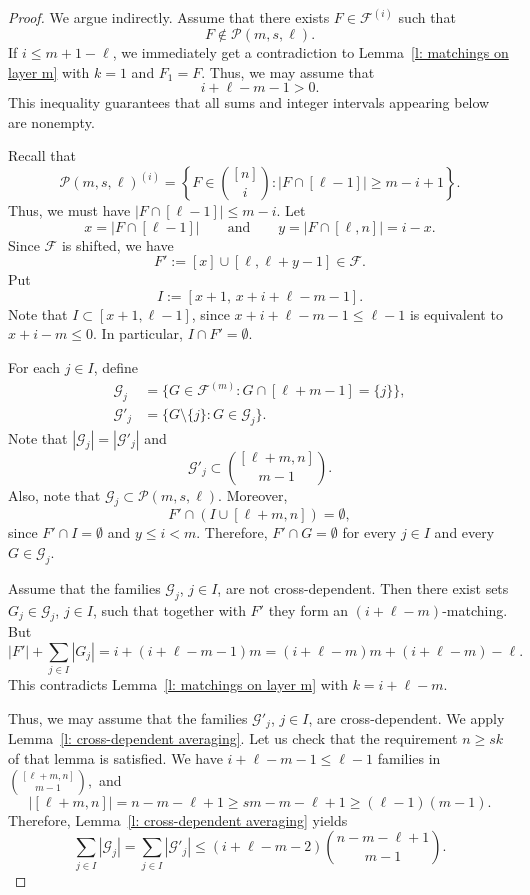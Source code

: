 \documentclass{article}
\begin{document}
\begin{proof}
    We argue indirectly. Assume that there exists $F \in \mathcal{F}^{(i)}$ such that
    \[
    F \notin \mathcal{P}(m, s, \ell).
    \]
    If $i \leq m + 1 - \ell$, we immediately get a contradiction to Lemma~\ref{l: matchings on layer m} with $k = 1$ and $F_1 = F$. Thus, we may assume that
    \[
    i + \ell - m - 1 > 0.
    \]
    This inequality guarantees that all sums and integer intervals appearing below are nonempty.

    Recall that
    \[
    \mathcal{P}(m, s, \ell)^{(i)} = \left\{F \in {[n]\choose i}: |F \cap [\ell - 1]| \geq m - i + 1\right\}.
    \]
    Thus, we must have $|F \cap [\ell - 1]| \leq m - i$. Let
    \[
    x = |F \cap [\ell - 1]|
    \qquad\text{and}\qquad
    y = |F \cap [\ell, n]| = i - x.
    \]
    Since $\mathcal{F}$ is shifted, we have
    \[
    F' := [x] \cup [\ell, \ell + y - 1] \in \mathcal{F}.
    \]
    Put
    \[
    I := [x + 1,\, x + i + \ell - m - 1].
    \]
    Note that $I\subset [x+1,\ell-1]$, since
    $
    x+i+\ell-m-1 \le \ell-1
    $
    is equivalent to $x+i-m\le 0$. In particular, $I\cap F'=\emptyset$.

    For each $j\in I$, define
    \begin{align*}
        \mathcal{G}_{j} &= \big\{G \in \mathcal{F}^{(m)}: G \cap [\ell + m - 1] = \{j\} \big\},\\
        \mathcal{G}'_{j} &= \{G\setminus\{j\}: G \in \mathcal{G}_j\}.
    \end{align*}
    Note that $|\mathcal{G}_{j}| = |\mathcal{G}'_{j}|$ and
    \[
    \mathcal{G}'_{j} \subset {[\ell + m, n] \choose m - 1}.
    \]
    Also, note that $\mathcal{G}_j\subset \mathcal{P}(m,s,\ell)$. Moreover,
    \[
    F' \cap (I\cup[\ell + m, n]) = \emptyset,
    \]
    since $F'\cap I=\emptyset$ and  $y \leq i < m$. Therefore, $F' \cap G = \emptyset$ for every $j \in I$ and every $G \in \mathcal{G}_{j}$.

    Assume that the families $\mathcal G_j$, $j\in I$, are not cross-dependent. Then there exist sets $G_j \in \mathcal{G}_j$, $j \in I$, such that together with $F'$ they form an $(i + \ell - m)$-matching. But
    \[
    |F'| + \sum_{j \in I }|G_j|
    = i + (i + \ell - m - 1)m
    = (i + \ell - m)m + (i + \ell - m) - \ell.
    \]
    This contradicts Lemma~\ref{l: matchings on layer m} with $k = i + \ell - m$.

    Thus, we may assume that the families $\mathcal{G}'_j$, $j\in I$, are cross-dependent. We apply Lemma~\ref{l: cross-dependent averaging}. Let us check that the requirement $n \geq sk$ of that lemma is satisfied. We have $i + \ell - m - 1 \leq \ell - 1$ families in
    $
    {[\ell + m , n] \choose m - 1},
    $
    and
    \[
    |[\ell + m, n]| = n - m-\ell + 1 \ge sm  - m - \ell + 1  \geq (\ell - 1)(m-1).
    \]
    Therefore, Lemma~\ref{l: cross-dependent averaging} yields
    \begin{equation} \label{eq: averaging application}
    \sum_{j\in I}|\mathcal{G}_j|
    = \sum_{j\in I}|\mathcal{G}'_j|
    \leq (i + \ell - m - 2){n - m - \ell +1 \choose m - 1}.
    \end{equation}


\end{proof}
\end{document}
